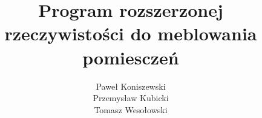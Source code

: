 \documentclass[12pt]{article}
\title{Program rozszerzonej rzeczywistości do meblowania pomiesczeń}
\author{Paweł Koniszewski \\ Przemysław Kubicki \\ Tomasz Wesołowski}
\begin{document}
	\stronatytulowa 
\end{document}

